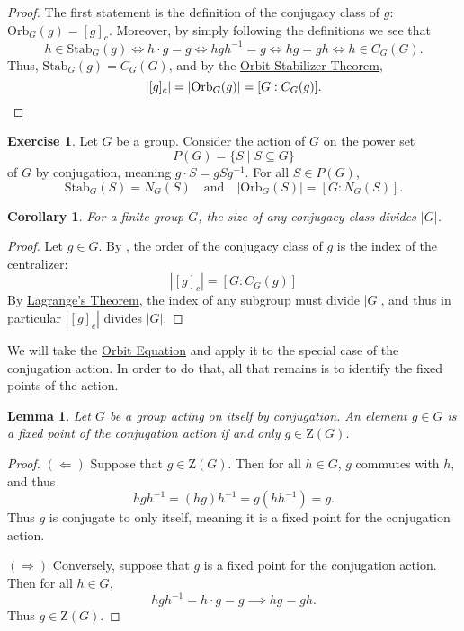 \documentclass[12pt]{report}
\newtheorem{lemma}[theorem]{Lemma}
\newtheorem{corollary}[theorem]{Corollary}
\numberwithin{equation}{section}
\numberwithin{theorem}{chapter}
\theoremstyle{definition}
\newtheorem{exercise}{Exercise}
\newtheorem*{basic properties}{Basic Properties}
\newtheorem*{Important Remark}{Important Remark}
\begin{document}
\begin{proof}
	The first statement is the definition of the conjugacy class of $g$: $\mathrm{Orb}_G(g) = [g]_c$. 	
	Moreover, by simply following the definitions we see that
	$$h \in \mathrm{Stab}_G(g) \iff h \cdot g = g \iff hgh^{-1} = g \iff hg = gh \iff h \in C_G(G).$$
	Thus, $\mathrm{Stab}_G(g)=C_G(G)$, and by the \hyperref[Orbit-Stabilizer Theorem]{Orbit-Stabilizer Theorem},
	$$|[g]_c| = |\mathrm{Orb}_G(g)| = [G : C_G(g)].\qedhere$$
\end{proof}


\begin{exercise}\label{conjugacy class exercise}
Let $G$ be a group. Consider the action of $G$ on the power set 
$$P(G)=\{S\mid S\subseteq G\}$$ 
of $G$ by conjugation, meaning $g \cdot S = gSg^{-1}$. For all $S \in P(G)$, 
$$\mathrm{Stab}_G(S)=N_G(S) \quad \textrm{and} \quad |\mathrm{Orb}_G(S)| = [G : N_G(S)].$$
\end{exercise}


\begin{corollary}
For a finite group $G$, the size of any conjugacy class divides $|G|$.	
\end{corollary}

\begin{proof}
Let $g \in G$. By , the order of the conjugacy class of $g$ is the index of the centralizer: 
$$|[g]_c| = [G : C_G(g)]$$ 
By \hyperref[Lagrange]{Lagrange's Theorem}, the index of any subgroup must divide $|G|$, and thus in particular $|[g]_c|$ divides $|G|$.
\end{proof}


We will take the \hyperref[Orbit Equation]{Orbit Equation} and apply it to the special case of the conjugation action. In order to do that, all that remains is to identify the fixed points of the action.


\begin{lemma}\label{fixed points conjugation are central}
	Let $G$ be a group acting on itself by conjugation. An element $g \in G$ is a fixed point of the conjugation action if and only $g \in \mathrm{Z}(G)$.
\end{lemma}

\begin{proof}
$(\Leftarrow)$ Suppose that $g \in \mathrm{Z}(G)$. Then for all $h \in G$, $g$ commutes with $h$, and thus
$$hgh^{-1} = (hg)h^{-1} = g(hh^{-1}) = g.$$
Thus $g$ is conjugate to only itself, meaning it is a fixed point for the conjugation action. 

$(\Rightarrow)$ Conversely, suppose that $g$ is a fixed point for the conjugation action. Then for all $h \in G$,
$$hgh^{-1} = h \cdot g = g \implies hg=gh.$$
Thus $g \in \mathrm{Z}(G)$.	
\end{proof}
\end{document}
